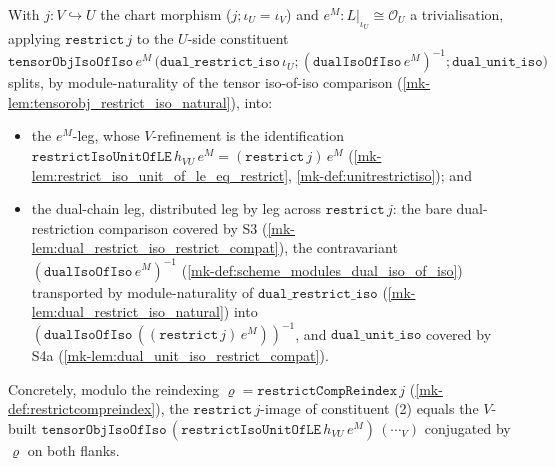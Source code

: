 \begin{lemma}\label{mk-lem:trivialisation_restrict_em_split}
  \leanok

  With \(j : V \hookrightarrow U\) the chart morphism (\(j \mathbin{;} \iota_U = \iota_V\)) and
  \(e^M : L|_{\iota_U} \cong \mathcal{O}_U\) a trivialisation, applying \(\mathtt{restrict}\,j\) to the
  \(U\)-side constituent
  \(\mathtt{tensorObjIsoOfIso}\,e^M\,\bigl(\mathtt{dual\_restrict\_iso}\,\iota_U \mathbin{;}
  (\mathtt{dualIsoOfIso}\,e^M)^{-1} \mathbin{;} \mathtt{dual\_unit\_iso}\bigr)\) splits, by
  module-naturality of the tensor iso-of-iso comparison
  (\ref{mk-lem:tensorobj_restrict_iso_natural}), into:
  \begin{itemize}
    \item the \(e^M\)-leg, whose \(V\)-refinement is the identification
      \(\mathtt{restrictIsoUnitOfLE}\,h_{VU}\,e^M = (\mathtt{restrict}\,j)\,e^M\)
      (\ref{mk-lem:restrict_iso_unit_of_le_eq_restrict}, \ref{mk-def:unitrestrictiso}); and
    \item the dual-chain leg, distributed leg by leg across \(\mathtt{restrict}\,j\): the bare
      dual-restriction comparison covered by S3 (\ref{mk-lem:dual_restrict_iso_restrict_compat}), the
      contravariant \((\mathtt{dualIsoOfIso}\,e^M)^{-1}\) (\ref{mk-def:scheme_modules_dual_iso_of_iso})
      transported by module-naturality of \(\mathtt{dual\_restrict\_iso}\)
      (\ref{mk-lem:dual_restrict_iso_natural}) into \((\mathtt{dualIsoOfIso}\,((\mathtt{restrict}\,j)\,e^M))^{-1}\),
      and \(\mathtt{dual\_unit\_iso}\) covered by S4a (\ref{mk-lem:dual_unit_iso_restrict_compat}).
  \end{itemize}
  Concretely, modulo the reindexing \(\varrho = \mathtt{restrictCompReindex}\,j\)
  (\ref{mk-def:restrictcompreindex}), the \(\mathtt{restrict}\,j\)-image of constituent (2) equals the
  \(V\)-built \(\mathtt{tensorObjIsoOfIso}\,(\mathtt{restrictIsoUnitOfLE}\,h_{VU}\,e^M)\,(\cdots_V)\)
  conjugated by \(\varrho\) on both flanks.
\end{lemma}
